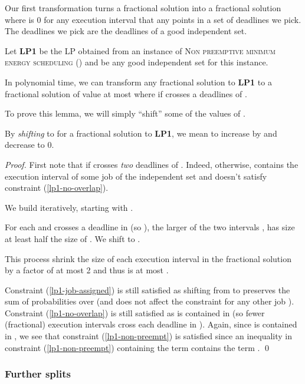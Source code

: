 Our first transformation turns a fractional solution into a fractional solution where  is 0 for any execution interval  that any points in a set of deadlines we pick. The deadlines we pick are the deadlines of a good independent set.

\begin{lem}\label{lem:deadline_zones}
  Let \textbf{LP1} be the LP obtained from an instance of \textsc{Non preemptive minimum energy scheduling ()} and  be any good independent set for this instance.

  In polynomial time, we can transform any fractional solution  to \textbf{LP1} to a fractional solution  of value at most  where  if  crosses a deadlines of .
\end{lem}

To prove this lemma, we will simply ``shift'' some of the values of .
\begin{defn}
  By \emph{shifting}  to  for a fractional solution  to \textbf{LP1}, we mean to increase  by  and decrease  to 0.
\end{defn}

\begin{proof}
  First note that  if  crosses \emph{two} deadlines of . Indeed, otherwise,  contains the execution interval of some job  of the independent set and  doesn't satisfy constraint (\ref{lp1-no-overlap}).

  We build  iteratively, starting with .

  For each  and  crosses a deadline  in  (so ),  the larger of the two intervals ,  has size at least half the size of . We shift  to . 

  This process shrink the size of each execution interval in the fractional solution by a factor of at most 2 and thus  is at most .

  Constraint (\ref{lp1-job-assigned}) is still satisfied as shifting  from  to  preserves the sum of probabilities over  (and does not affect the constraint for any other job ).
  Constraint (\ref{lp1-no-overlap}) is still satisfied as  is contained in  (so fewer (fractional) execution intervals cross each deadline in ).
  Again, since  is contained in , we see that constraint (\ref{lp1-non-preempt}) is satisfied since an inequality in constraint (\ref{lp1-non-preempt}) containing the term  contains the term .
\qed\end{proof}




\subsubsection{Further splits}

